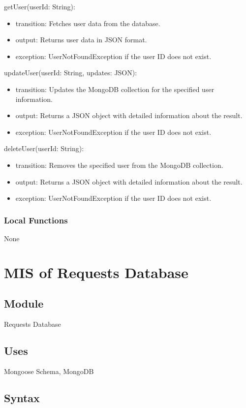 \documentclass[12pt, titlepage]{article}
\begin{document}
\noindent getUser(userId: String):
\begin{itemize}
  \item transition: Fetches user data from the database.
  \item output: Returns user data in JSON format.
  \item exception: UserNotFoundException if the user ID does not exist.
\end{itemize}

\noindent updateUser(userId: String, updates: JSON):
\begin{itemize}
  \item transition: Updates the MongoDB collection for the specified user information.
  \item output: Returns a JSON object with detailed information about the result.
  \item exception: UserNotFoundException if the user ID does not exist.
\end{itemize}

\noindent deleteUser(userId: String):
\begin{itemize}
  \item transition: Removes the specified user from the MongoDB collection.
  \item output: Returns a JSON object with detailed information about the result.
  \item exception: UserNotFoundException if the user ID does not exist.
\end{itemize}

\subsubsection{Local Functions}
None

\section{MIS of Requests Database} \label{Requests Database}

\subsection{Module}
Requests Database

\subsection{Uses}
Mongoose Schema, MongoDB

\subsection{Syntax}
\end{document}
